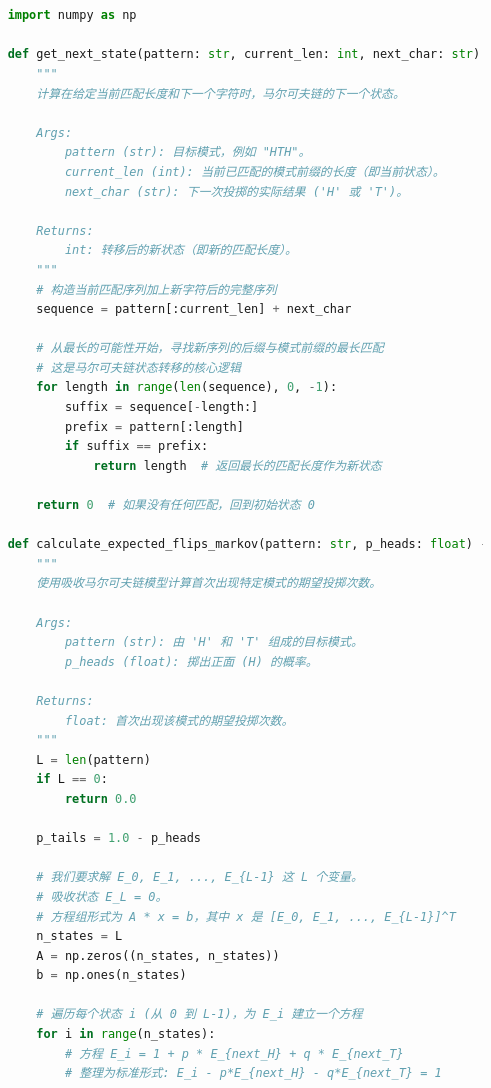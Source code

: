 \documentclass[UTF8]{ctexart}
\begin{document}
\begin{lstlisting}[language=Python, caption={求解期望投掷次数的函数核心逻辑}]


    import numpy as np

    def get_next_state(pattern: str, current_len: int, next_char: str) -> int:
        """
        计算在给定当前匹配长度和下一个字符时，马尔可夫链的下一个状态。
    
        Args:
            pattern (str): 目标模式，例如 "HTH"。
            current_len (int): 当前已匹配的模式前缀的长度（即当前状态）。
            next_char (str): 下一次投掷的实际结果 ('H' 或 'T')。
    
        Returns:
            int: 转移后的新状态（即新的匹配长度）。
        """
        # 构造当前匹配序列加上新字符后的完整序列
        sequence = pattern[:current_len] + next_char
    
        # 从最长的可能性开始，寻找新序列的后缀与模式前缀的最长匹配
        # 这是马尔可夫链状态转移的核心逻辑
        for length in range(len(sequence), 0, -1):
            suffix = sequence[-length:]
            prefix = pattern[:length]
            if suffix == prefix:
                return length  # 返回最长的匹配长度作为新状态
    
        return 0  # 如果没有任何匹配，回到初始状态 0
    
    def calculate_expected_flips_markov(pattern: str, p_heads: float) -> float:
        """
        使用吸收马尔可夫链模型计算首次出现特定模式的期望投掷次数。
    
        Args:
            pattern (str): 由 'H' 和 'T' 组成的目标模式。
            p_heads (float): 掷出正面 (H) 的概率。
    
        Returns:
            float: 首次出现该模式的期望投掷次数。
        """
        L = len(pattern)
        if L == 0:
            return 0.0
    
        p_tails = 1.0 - p_heads
        
        # 我们要求解 E_0, E_1, ..., E_{L-1} 这 L 个变量。
        # 吸收状态 E_L = 0。
        # 方程组形式为 A * x = b，其中 x 是 [E_0, E_1, ..., E_{L-1}]^T
        n_states = L
        A = np.zeros((n_states, n_states))
        b = np.ones(n_states)
    
        # 遍历每个状态 i (从 0 到 L-1)，为 E_i 建立一个方程
        for i in range(n_states):
            # 方程 E_i = 1 + p * E_{next_H} + q * E_{next_T}
            # 整理为标准形式: E_i - p*E_{next_H} - q*E_{next_T} = 1
            

\end{lstlisting}
\end{document}
